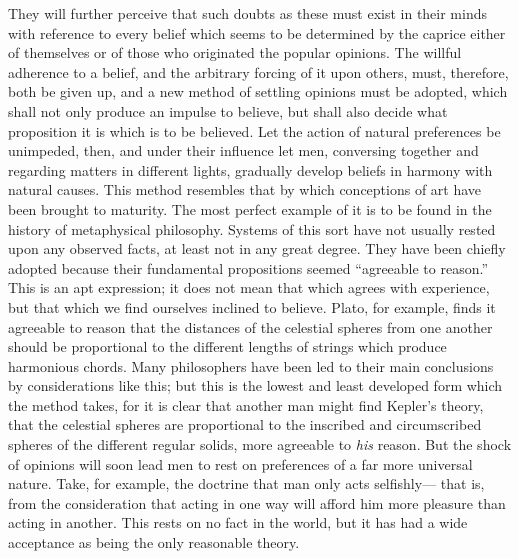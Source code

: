 \documentclass[]{article}
\begin{document}
They will further perceive that such doubts as these must exist in their minds with reference to every belief which seems to be determined by the caprice either of themselves or of those who originated the popular opinions. The willful adherence to a belief, and the arbitrary forcing of it upon others, must, therefore, both be given up, and a new method of settling opinions must be adopted, which shall not only produce an impulse to believe, but shall also decide what proposition it is which is to be believed. Let the action of natural preferences be unimpeded, then, and under their influence let men, conversing together and regarding matters in different lights, gradually develop beliefs in harmony with natural causes. This method resembles that by which conceptions of art have been brought to maturity. The most perfect example of it is to be found in the history of metaphysical philosophy. Systems of this sort have not usually rested upon any observed facts, at least not in any great degree. They have been chiefly adopted because their fundamental propositions seemed ``agreeable to reason.'' This is an apt expression; it does not mean that which agrees with experience, but that which we find ourselves inclined to believe. Plato, for example, finds it agreeable to reason that the distances of the celestial spheres from one another should be proportional to the different lengths of strings which produce harmonious chords. Many philosophers have been led to their main conclusions by considerations like this; but this is the lowest and least developed form which the method takes, for it is clear that another man might find Kepler's theory, that the celestial spheres are proportional to the inscribed and circumscribed spheres of the different regular solids, more agreeable to \emph{his} reason. But the shock of opinions will soon lead men to rest on preferences of a far more universal nature. Take, for example, the doctrine that man only acts selfishly--- that is, from the consideration that acting in one way will afford him more pleasure than acting in another. This rests on no fact in the world, but it has had a wide acceptance as being the only reasonable theory.
\end{document}
